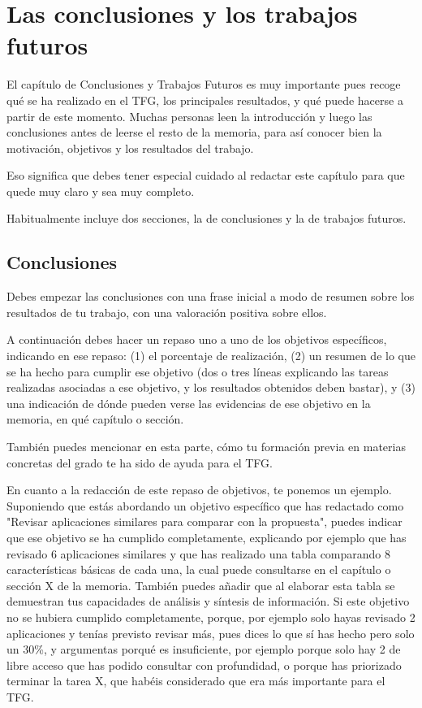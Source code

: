 \chapter{Las conclusiones y los trabajos futuros}
\label{cap:Conclusiones}

El capítulo de Conclusiones y Trabajos Futuros es muy importante pues recoge qué se ha realizado en el TFG, los principales resultados, y qué puede hacerse a partir de este momento. Muchas personas leen la introducción y luego las conclusiones antes de leerse el resto de la memoria, para así conocer bien la motivación, objetivos y los resultados del trabajo.

Eso significa que debes tener especial cuidado al redactar este capítulo para que quede muy claro y sea muy completo.

Habitualmente incluye dos secciones, la de conclusiones y la de trabajos futuros.
 
 \section{Conclusiones}

Debes empezar las conclusiones con una frase inicial a modo de resumen sobre los resultados de tu trabajo, con una valoración positiva sobre ellos. 

A continuación debes hacer un repaso uno a uno de los objetivos específicos, indicando en ese repaso: (1) el porcentaje de realización, (2) un resumen de lo que se ha hecho para cumplir ese objetivo (dos o tres líneas explicando las tareas realizadas asociadas a ese objetivo, y los resultados obtenidos deben bastar), y (3) una indicación de dónde pueden verse las evidencias de ese objetivo en la memoria, en qué capítulo o sección.

También puedes mencionar en esta parte, cómo tu formación previa en materias concretas del grado te ha sido de ayuda para el TFG. 

 En cuanto a la redacción de este repaso de objetivos, te ponemos un ejemplo. Suponiendo que estás abordando un objetivo específico que has redactado como "Revisar aplicaciones similares para comparar con la propuesta", puedes indicar que ese objetivo se ha cumplido completamente, explicando por ejemplo que has revisado 6 aplicaciones similares y que has realizado una tabla comparando 8 características básicas de cada una, la cual puede consultarse en el capítulo o sección X de la memoria. También puedes añadir que al elaborar esta tabla se demuestran tus capacidades de análisis y síntesis de información. Si este objetivo no se hubiera cumplido completamente, porque, por ejemplo solo hayas revisado 2 aplicaciones y tenías previsto revisar más, pues dices lo que sí has hecho pero solo un 30\%, y argumentas porqué es insuficiente, por ejemplo porque solo hay 2 de libre acceso que has podido consultar con profundidad, o porque has priorizado terminar la tarea X, que habéis considerado que era más importante para el TFG. 

